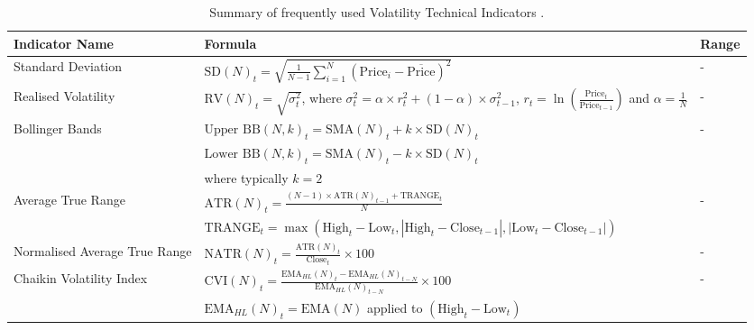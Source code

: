\begin{table}[htb!]
\centering
\footnotesize
\begin{tabularx}{\textwidth}{@{}lXl@{}}
\toprule
\textbf{Indicator Name} & \textbf{Formula} & \textbf{Range} \\
\midrule
Standard Deviation & $\text{SD}(N)_t = \sqrt{\frac{1}{N-1} \sum_{i=1}^{N} (\text{Price}_i - \overline{\text{Price}})^2}$ & - \\
\addlinespace
Realised Volatility & $\text{RV}(N)_t = \sqrt{\sigma^2_t}$, where $\sigma^2_t = \alpha \times r_t^2 + (1 - \alpha) \times \sigma^2_{t-1}$, $r_t = \ln\left(\frac{\text{Price}_t}{\text{Price}_{t-1}}\right)$ and $\alpha = \frac{1}{N}$ & - \\
\addlinespace
Bollinger Bands & $\text{Upper BB}(N, k)_t = \text{SMA}(N)_t + k \times \text{SD}(N)_t$ & - \\
\addlinespace
& $\text{Lower BB}(N, k)_t = \text{SMA}(N)_t - k \times \text{SD}(N)_t$ & \\
\addlinespace
& where typically $ k = 2 $& \\
\addlinespace
Average True Range & $\text{ATR}(N)_t = \frac{(N - 1) \times \text{ATR}(N)_{t-1} + \text{TRANGE}_t}{N}$ & - \\
\addlinespace
& $\text{TRANGE}_t = \max(\text{High}_t - \text{Low}_t, |\text{High}_t - \text{Close}_{t-1}|, |\text{Low}_t - \text{Close}_{t-1}|)$ & \\
\addlinespace
Normalised Average True Range & $\text{NATR}(N)_t = \frac{\text{ATR}(N)_t}{\text{Close}_t} \times 100$ & - \\
\addlinespace
Chaikin Volatility Index & $\text{CVI}(N)_t = \frac{\text{EMA}_{HL}(N)_t - \text{EMA}_{HL}(N)_{t-N}}{\text{EMA}_{HL}(N)_{t-N}} \times 100$ & - \\
\addlinespace
& $\text{EMA}_{HL}(N)_t = \text{EMA}(N)$ applied to $(\text{High}_t - \text{Low}_t)$ & \\
\bottomrule
\end{tabularx}
\caption{Summary of frequently used Volatility Technical Indicators \cite{jansen_machine_2020}.}
\label{Tables:VolatilityIndicators}
\end{table}